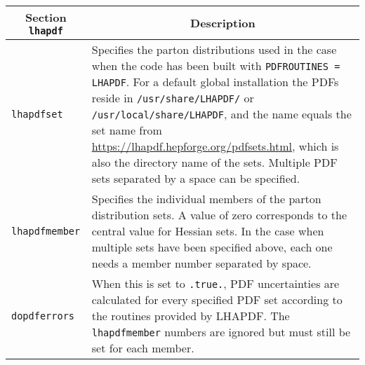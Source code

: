 	\begin{longtable}{p{1.5cm}p{12cm}}
		\hline
		\multicolumn{1}{c}{{\textbf{Section} \texttt{lhapdf}}} & \multicolumn{1}{c}{{\textbf{Description}}} \\ 
		\hline
		\texttt{lhapdfset} &
		Specifies the parton distributions used in the case when the code has been built with
		\texttt{PDFROUTINES = LHAPDF}. For a default global installation the PDFs reside
		in \texttt{/usr/share/LHAPDF/} or \texttt{/usr/local/share/LHAPDF}, and the name
		equals the set name from \url{https://lhapdf.hepforge.org/pdfsets.html}, which is
		also the directory name of the sets. Multiple PDF sets separated by a space can be specified. \\
		\texttt{lhapdfmember} & Specifies the individual members of the parton distribution sets.
		A value of zero corresponds to the central value for Hessian sets. In the case when multiple sets
		have been specified above, each one needs a member number separated by space. \\
		\texttt{dopdferrors} & When this is set to \texttt{.true.}, PDF uncertainties are calculated
		for every specified PDF set according to the routines provided by LHAPDF.
		The \texttt{lhapdfmember} numbers are ignored but must still be set for each member. \\
		\hline
	\end{longtable}
